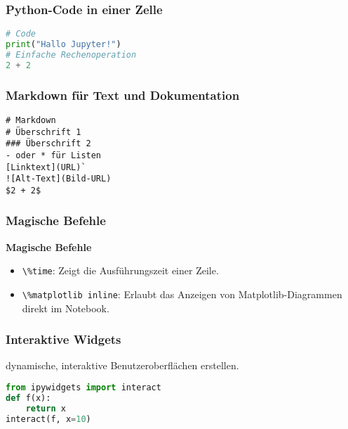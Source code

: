\documentclass{vorlage-design-main}
\begin{document}
\hypertarget{python-code-in-einer-zelle}{%
\subsubsection{Python-Code in einer
Zelle}\label{python-code-in-einer-zelle}}

\begin{lstlisting}[language=Python]
# Code
print("Hallo Jupyter!")
# Einfache Rechenoperation
2 + 2
\end{lstlisting}

\hypertarget{markdown-fuxfcr-text-und-dokumentation}{%
\subsubsection{Markdown für Text und
Dokumentation}\label{markdown-fuer-text-und-dokumentation}}

\begin{lstlisting}
# Markdown
# Überschrift 1
### Überschrift 2
- oder * für Listen
[Linktext](URL)`
![Alt-Text](Bild-URL)
$2 + 2$
\end{lstlisting}

\hypertarget{magische-befehle}{%
\subsubsection{Magische Befehle}\label{magische-befehle}}

\textbf{Magische Befehle}

\begin{itemize}

\item
  \verb|\%time|: Zeigt die Ausführungszeit einer
  Zeile.
\item
  \verb|\%matplotlib inline|: Erlaubt das Anzeigen
  von Matplotlib-Diagrammen direkt im Notebook.
\end{itemize}

\hypertarget{interaktive-widgets}{%
\subsubsection{Interaktive Widgets}\label{interaktive-widgets}}

dynamische, interaktive Benutzeroberflächen erstellen.

\begin{lstlisting}[language=Python]
from ipywidgets import interact
def f(x):
    return x
interact(f, x=10)
\end{lstlisting}
\end{document}
